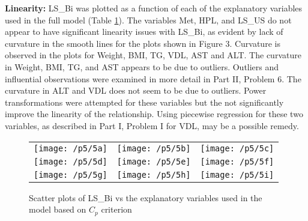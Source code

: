\documentclass{article}
\begin{document}
\textbf{Linearity:} LS\_Bi was plotted as a function of each of the explanatory variables used in the full model (Table \ref{cpScatter}). The variables Met, HPL, and LS\_US do not appear to have significant linearity issues with LS\_Bi, as evident by lack of curvature in the smooth lines for the plots shown in Figure 3. Curvature is observed in the plots for Weight, BMI, TG, VDL, AST and ALT. The curvature in Weight, BMI, TG, and AST appears to be due to outliers. Outliers and influential observations were examined in more detail in Part II, Problem 6. The curvature in ALT and VDL does not seem to be due to outliers. Power transformations were attempted for these variables but the not significantly improve the linearity of the relationship. Using piecewise regression for these two variables, as described in Part I, Problem I for  VDL, may be a possible remedy.\\
\begin{figure}[H]
\begin{tabular}{c c c}
\begin{minipage}{.32\textwidth}
\centering
\texttt{[image: /p5/5a]}
\end{minipage}
&
\begin{minipage}{.32\textwidth}
\centering
\texttt{[image: /p5/5b]}
\end{minipage}
&
\begin{minipage}{.3\textwidth}
\centering
\texttt{[image: /p5/5c]}
\end{minipage}
\\
\begin{minipage}{.3\textwidth}
\centering
\texttt{[image: /p5/5d]}
\end{minipage}
&
\begin{minipage}{.3\textwidth}
\centering
\texttt{[image: /p5/5e]}
\end{minipage}
&
\begin{minipage}{.3\textwidth}
\centering
\texttt{[image: /p5/5f]}
\end{minipage}
\\
\begin{minipage}{.3\textwidth}
\centering
\texttt{[image: /p5/5g]}
\end{minipage}
&
\begin{minipage}{.3\textwidth}
\centering
\texttt{[image: /p5/5h]}
\end{minipage}
&
\begin{minipage}{.3\textwidth}
\centering
\texttt{[image: /p5/5i]}
\end{minipage}
\end{tabular}
\caption {Scatter plots of LS\_Bi vs the explanatory variables used in the model based on $C_p$ criterion} \label{cpScatter} 
\end{figure}
\end{document}
